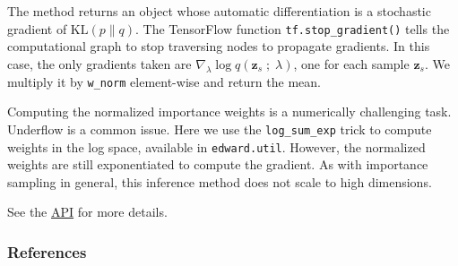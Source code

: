 The method returns an object whose
automatic differentiation is a stochastic gradient of $\text{KL}(p\|q)$.
The TensorFlow function \texttt{tf.stop_gradient()} tells the computational
graph to stop traversing nodes to propagate gradients. In this case,
the only gradients taken are $\nabla_\lambda \log q(\mathbf{z}_s\;;\;\lambda)$,
one for each sample $\mathbf{z}_s$. We multiply it by \texttt{w_norm}
element-wise and return the mean.

Computing the normalized importance weights is a numerically
challenging task.  Underflow is a common issue. Here we use the
\texttt{log_sum_exp} trick to compute weights in the log space,
available in \texttt{edward.util}. However, the normalized weights are
still exponentiated to compute the gradient. As with importance
sampling in general, this inference method does not scale to high
dimensions.

See the \href{/api/}{API} for more details.

\subsubsection{References}\label{references}

